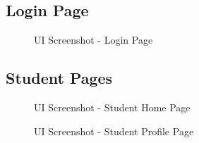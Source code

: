 \subsection{Login Page}
\begin{figure}[H]
    \centering
    \caption{UI Screenshot - Login Page}
    \label{fig:ss_login}
\end{figure}

\subsection{Student Pages}
\begin{figure}[H]
    \centering
    \caption{UI Screenshot - Student Home Page}
    \label{fig:ss_s_home}
\end{figure}

\begin{figure}[H]
    \centering
    \caption{UI Screenshot - Student Profile Page}
    \label{fig:ss_s_profile}
\end{figure}


